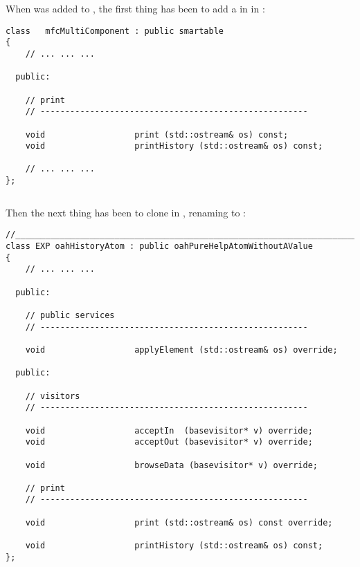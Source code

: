 When  was added to \oahRepr, the first thing has been to add a  in  in :
\begin{lstlisting}[language=CPlusPlus]
class   mfcMultiComponent : public smartable
{
	// ... ... ...

  public:

    // print
    // ------------------------------------------------------

    void                  print (std::ostream& os) const;
    void                  printHistory (std::ostream& os) const;

	// ... ... ...
};
\end{lstlisting}

\begin{lstlisting}[language=CPlusPlus]

\end{lstlisting}

Then the next thing has been to clone  in , renaming  to :
\begin{lstlisting}[language=CPlusPlus]
//______________________________________________________________________________
class EXP oahHistoryAtom : public oahPureHelpAtomWithoutAValue
{
	// ... ... ...

  public:

    // public services
    // ------------------------------------------------------

    void                  applyElement (std::ostream& os) override;

  public:

    // visitors
    // ------------------------------------------------------

    void                  acceptIn  (basevisitor* v) override;
    void                  acceptOut (basevisitor* v) override;

    void                  browseData (basevisitor* v) override;

    // print
    // ------------------------------------------------------

    void                  print (std::ostream& os) const override;

    void                  printHistory (std::ostream& os) const;
};
\end{lstlisting}

